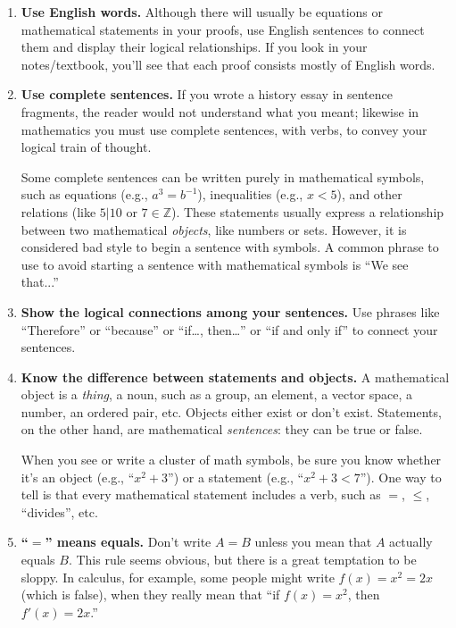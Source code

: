 \begin{enumerate}
\item \textbf{Use English words.} Although there will usually be equations or mathematical statements in your proofs, use English sentences to connect them and display their logical relationships. If you look in your notes/textbook, you'll see that each proof consists mostly of English words.

\item \textbf{Use complete sentences.} If you wrote a history essay in sentence fragments, the reader would not understand what you meant; likewise in mathematics you must use complete sentences, with verbs, to convey your logical train of thought.

Some complete sentences can be written purely in mathematical symbols, such as equations (e.g., $a^3=b^{-1}$), inequalities (e.g., $x<5$), and other relations (like $5\big|10$ or $7\in\mathbb{Z}$). These statements usually express a relationship between two mathematical \emph{objects}, like numbers or sets.  However, it is considered bad style to begin a sentence with symbols.  A common phrase to use to avoid starting a sentence with mathematical symbols is ``We see that...''

\item \textbf{Show the logical connections among your sentences.} Use phrases like ``Therefore'' or ``because'' or ``if\ldots, then\ldots'' or ``if and only if'' to connect your sentences.
  
\item \textbf{Know the difference between statements and objects.} A mathematical object is a \emph{thing}, a noun, such as a group, an element, a vector space, a number, an ordered pair, etc. Objects either exist or don't exist. Statements, on the other hand, are mathematical \emph{sentences}:  they can be true or false.

When you see or write a cluster of math symbols, be sure you know  whether it's an object (e.g., ``$x^2+3$'') or a statement (e.g., ``$x^2+3<7$''). One way to tell is that every mathematical statement includes a verb, such as $=$, $\leq$, ``divides'', etc.

\item \textbf{``$=$'' means equals.} Don't write $A=B$ unless you mean that $A$ actually equals $B$. This rule seems obvious, but there is a great temptation to be sloppy.  In calculus, for example, some people might write $f(x)=x^{2}=2x$ (which is false), when they really mean that ``if $f(x)=x^{2}$, then $f'(x)=2x$.''


\end{enumerate}

